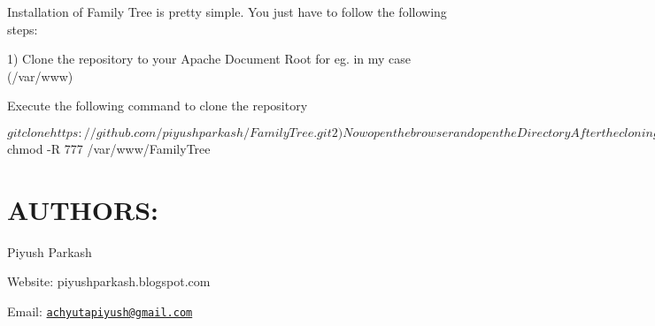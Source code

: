 Installation of Family Tree is pretty simple. You just have to follow the following steps\-: \begin{DoxyVerb}1) Clone the repository to your Apache Document Root for eg. in my case (/var/www)

    Execute the following command to clone the repository

        $ git clone https://github.com/piyushparkash/FamilyTree.git

2) Now open the browser and open the Directory

    After the cloning repository A folder named FamilyTree will be created in your document root

    with path that will look something like this (/var/www/FamilyTree)

    Then you can write the following in browser http://localhost/FamilyTree/

3) Make sure you have given proper write permissions to the FamilyTree Folder

    If not then you can do it by executing the following command

        $ chmod -R 777 /var/www/FamilyTree
\end{DoxyVerb}


\section*{A\-U\-T\-H\-O\-R\-S\-:}

Piyush Parkash

Website\-: piyushparkash.\-blogspot.\-com

Email\-: \href{mailto:achyutapiyush@gmail.com}{\tt achyutapiyush@gmail.\-com} 